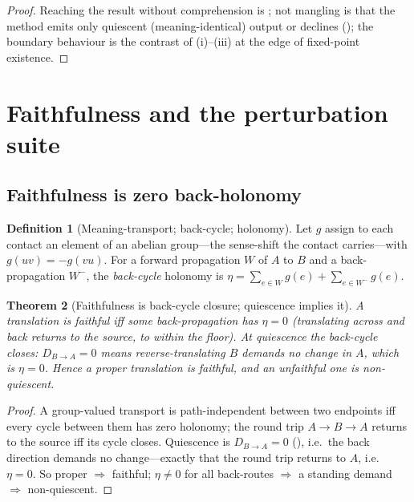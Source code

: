 \documentclass[11pt,a4paper]{article}
\theoremstyle{thmstyle}
\newtheorem{theorem}{Theorem}[section]
\theoremstyle{definition}
\newtheorem{definition}[theorem]{Definition}
\theoremstyle{remark}
\newcommand{\hol}{\eta}                %
\newcommand{\Walk}{W}
\newcommand{\colA}{A}                  %
\newcommand{\colB}{B}                  %
\newcommand{\demand}{D}                %
\begin{document}
\begin{proof}
Reaching the result without comprehension is ; not mangling is
that the method emits only quiescent (meaning-identical) output or declines
(); the boundary behaviour is the contrast of
(i)--(iii) at the edge of fixed-point existence.
\end{proof}

\section{Faithfulness and the perturbation suite}
\label{sec:faithful}

\subsection{Faithfulness is zero back-holonomy}

\begin{definition}[Meaning-transport; back-cycle; holonomy]
\label{def:holonomy}
Let $g$ assign to each contact an element of an abelian group---the
sense-shift the contact carries---with $g(uv)=-g(vu)$. For a forward
propagation $\Walk$ of $\colA$ to $\colB$ and a back-propagation $\Walk^{-}$,
the \emph{back-cycle} holonomy is $\hol=\sum_{e\in\Walk}g(e)+
\sum_{e\in\Walk^{-}}g(e)$.
\end{definition}

\begin{theorem}[Faithfulness is back-cycle closure; quiescence implies it]
\label{thm:faithful}
A translation is \emph{faithful} iff some back-propagation has $\hol=0$
(translating across and back returns to the source, to within the floor). At
quiescence the back-cycle closes: $\demand_{\colB\to\colA}=0$ means
reverse-translating $\colB$ demands no change in $\colA$, which is
$\hol=0$. Hence a proper translation is faithful, and an unfaithful one is
non-quiescent.
\end{theorem}

\begin{proof}
A group-valued transport is path-independent between two endpoints iff every
cycle between them has zero holonomy; the round trip $\colA\to\colB\to\colA$
returns to the source iff its cycle closes. Quiescence is
$\demand_{\colB\to\colA}=0$ (), i.e.\ the back direction
demands no change---exactly that the round trip returns to $\colA$, i.e.\
$\hol=0$. So proper $\Rightarrow$ faithful; $\hol\neq0$ for all back-routes
$\Rightarrow$ a standing demand $\Rightarrow$ non-quiescent.
\end{proof}
\end{document}
